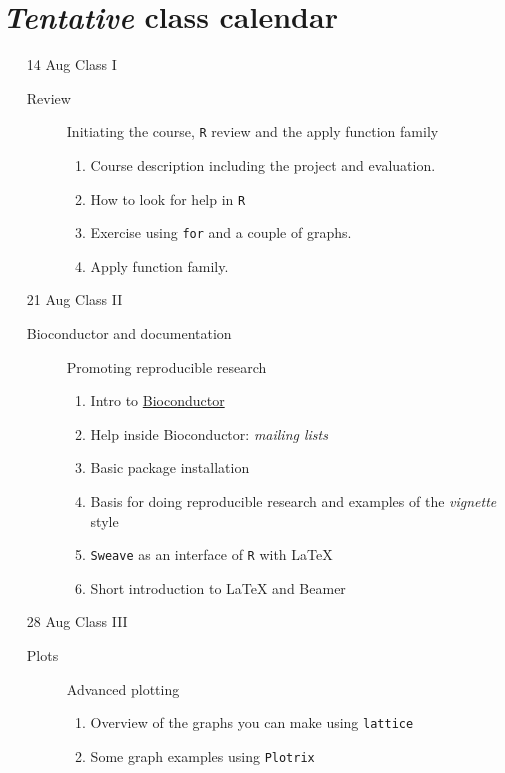 \documentclass[letterpaper,12pt]{article}
\newcommand{\pl}[1]{\texttt{#1}}
\newcommand{\myurlshort}[2]{\href{http://#1}{{\textsf{#2}}}}
\begin{document}
\section{\emph{Tentative} class calendar}

\begin{itemize} 

\item[14 Aug] Class I
  \begin{description}
  \item[Review] Initiating the course, \pl{R} review and the apply function family
  \begin{enumerate}
  \item Course description including the project and evaluation.
  \item How to look for help in \pl{R}
  \item Exercise using \pl{for} and a couple of graphs.
  \item Apply function family.
  \end{enumerate}
  \end{description}
  
  \item[21 Aug] Class II
  \begin{description}
  \item[Bioconductor and documentation] Promoting reproducible research
  \begin{enumerate}
  \item Intro to \myurlshort{bioconductor.org}{Bioconductor}
  \item Help inside Bioconductor: \emph{mailing lists}
  \item Basic package installation
  \item Basis for doing reproducible research and examples of the \emph{vignette} style
  \item \pl{Sweave} as an interface of \pl{R} with \LaTeX{}
  \item Short introduction to \LaTeX{} and Beamer
  \end{enumerate}
  \end{description}
  
  \item[28 Aug] Class III
  \begin{description}
  \item[Plots] Advanced plotting
  \begin{enumerate}
  \item Overview of the graphs you can make using \pl{lattice}
  \item Some graph examples using \pl{Plotrix}
  \end{enumerate}
  \end{description}
  

\end{itemize}
\end{document}
